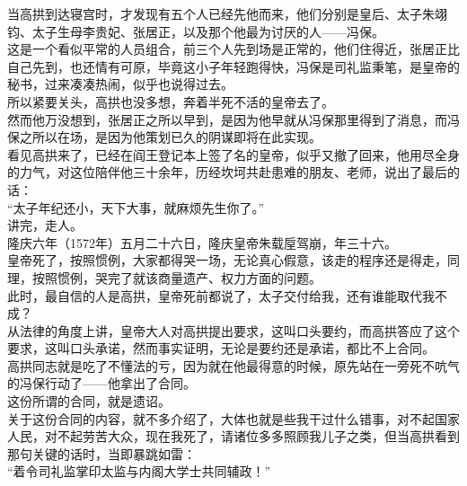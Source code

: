 \begin{multicols}{\theparacolNo}
当高拱到达寝宫时，才发现有五个人已经先他而来，他们分别是皇后、太子朱翊钧、太子生母李贵妃、张居正，以及那个他最为讨厌的人——冯保。\\

这是一个看似平常的人员组合，前三个人先到场是正常的，他们住得近，张居正比自己先到，也还情有可原，毕竟这小子年轻跑得快，冯保是司礼监秉笔，是皇帝的秘书，过来凑凑热闹，似乎也说得过去。\\

所以紧要关头，高拱也没多想，奔着半死不活的皇帝去了。\\

然而他万没想到，张居正之所以早到，是因为他早就从冯保那里得到了消息，而冯保之所以在场，是因为他策划已久的阴谋即将在此实现。\\

看见高拱来了，已经在阎王登记本上签了名的皇帝，似乎又撤了回来，他用尽全身的力气，对这位陪伴他三十余年，历经坎坷共赴患难的朋友、老师，说出了最后的话：\\

“太子年纪还小，天下大事，就麻烦先生你了。”\\

讲完，走人。\\

隆庆六年（1572年）五月二十六日，隆庆皇帝朱载垕驾崩，年三十六。\\

皇帝死了，按照惯例，大家都得哭一场，无论真心假意，该走的程序还是得走，同理，按照惯例，哭完了就该商量遗产、权力方面的问题。\\

此时，最自信的人是高拱，皇帝死前都说了，太子交付给我，还有谁能取代我不成？\\

从法律的角度上讲，皇帝大人对高拱提出要求，这叫口头要约，而高拱答应了这个要求，这叫口头承诺，然而事实证明，无论是要约还是承诺，都比不上合同。\\

高拱同志就是吃了不懂法的亏，因为就在他最得意的时候，原先站在一旁死不吭气的冯保行动了——他拿出了合同。\\

这份所谓的合同，就是遗诏。\\

关于这份合同的内容，就不多介绍了，大体也就是些我干过什么错事，对不起国家人民，对不起劳苦大众，现在我死了，请诸位多多照顾我儿子之类，但当高拱看到那句关键的话时，当即暴跳如雷：\\

“着令司礼监掌印太监与内阁大学士共同辅政！”\\


\end{multicols}
